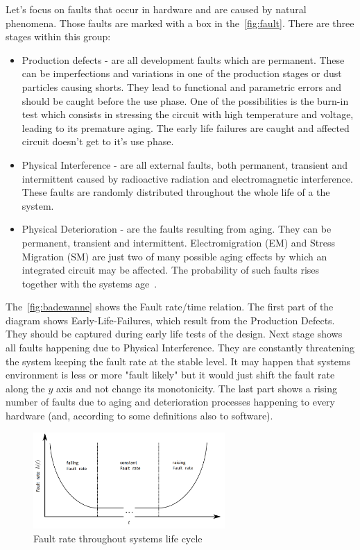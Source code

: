 Let's focus on faults that occur in hardware and are caused by natural phenomena. Those faults are marked with a box in the~\autoref{fig:fault}. There are three stages within this group:
\begin{itemize}
    \item Production defects - are all development faults which are permanent. These can be imperfections and variations in one of the production stages or dust particles causing shorts. They lead to functional and parametric errors and should be caught before the use phase. One of the possibilities is the burn-in test which consists in stressing the circuit with high temperature and voltage, leading to its premature aging. The early life failures are caught and affected circuit doesn't get to it's use phase.
    \item Physical Interference - are all external faults, both permanent, transient and intermittent caused by radioactive radiation and electromagnetic interference. These faults are randomly distributed throughout the whole life of a the system.
    \item Physical Deterioration - are the faults resulting from aging. They can be permanent, transient and intermittent. Electromigration (EM) and Stress Migration (SM) are just two of many possible aging effects by which an integrated circuit may be affected. The probability of such faults rises together with the systems age~\cite{art:Avizienis, art:Avizienis2}.
\end{itemize}
The~\autoref{fig:badewanne} shows the Fault rate/time relation. The first part of the diagram shows Early-Life-Failures, which result from the Production Defects. They should be captured during early life tests of the design. Next stage shows all faults happening due to Physical Interference. They are constantly threatening the system keeping the fault rate at the stable level. It may happen that systems environment is less or more "fault likely" but it would just shift the fault rate along the $y$ axis and not change its monotonicity. The last part shows a rising number of faults due to aging and deterioration processes happening to every hardware (and, according to some definitions also to software).

\begin{figure}[H]
\centering
\includegraphics[width=0.65\textwidth]{figures/badewanne.png}
\caption{Fault rate throughout systems life cycle~\cite{art:Avizienis}}
\label{fig:badewanne}
\end{figure}


